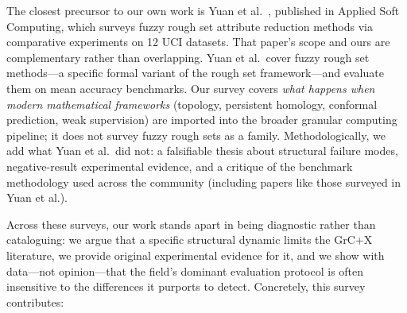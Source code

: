 The closest precursor to our own work is Yuan et al.~\cite{Yuan2021survey},
published in Applied Soft Computing, which surveys fuzzy
rough set attribute reduction methods via comparative experiments on 12 UCI
datasets.  That paper's scope and ours are complementary rather than
overlapping.  Yuan et al.\ cover fuzzy rough set methods---a specific
formal variant of the rough set framework---and evaluate them on mean accuracy
benchmarks.  Our survey covers \emph{what happens when modern mathematical
frameworks} (topology, persistent homology, conformal prediction, weak
supervision) are imported into the broader granular computing pipeline; it
does not survey fuzzy rough sets as a family.  Methodologically, we add what
Yuan et al.\ did not: a falsifiable thesis about structural failure modes,
negative-result experimental evidence, and a critique of the benchmark
methodology used across the community (including papers like those surveyed
in Yuan et al.).

Across these surveys, our work stands apart in being diagnostic rather than
cataloguing: we argue that a specific structural dynamic limits the GrC+X
literature, we provide original experimental evidence for it, and we show
with data---not opinion---that the field's dominant evaluation protocol is
often insensitive to the differences it purports to detect.  Concretely,
this survey contributes:

